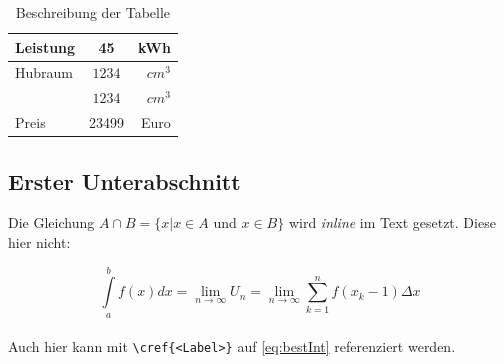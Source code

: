 \documentclass[BCOR=1cm, twoside, ngerman]{scrreprt}
\begin{document}
\begin{table}[h] %
\label{tab:beispieltabelle} %
\caption{Beschreibung der Tabelle}
\centering
  \begin{tabular}{|lc|r|}
    \hline
    Leistung & 45 & kWh \\
    \hline
    Hubraum & $1234$ & $cm^3$ \\
    \cline{3-3}
    & $1234$ & $cm^3$ \\
    Preis & 23499 & Euro \\
    \hline
  \end{tabular}
\end{table}

\subsection{Erster Unterabschnitt}
Die Gleichung $A \cap B = \{ x | x \in A$ und $x \in B \}$ wird \emph{inline} im Text gesetzt. Diese hier nicht:

\begin{equation}
  \int\limits_{a}^{b}f(x)dx
  = \lim\limits_{n\rightarrow \infty} U_{n}
  = \lim\limits_{n\rightarrow \infty} \sum\limits_{k=1}^{n}f(x_{k} -1)\Delta x
\label{eq:bestInt}
\end{equation}\\

Auch hier kann mit \texttt{\textbackslash cref\{<Label>\}} auf \cref{eq:bestInt} referenziert werden.

\printbibliography[heading=bibintoc, title={Literaturverzeichnis}]


% 
% 
% 
% 
% 
\end{document}
